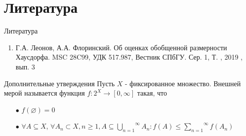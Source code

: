 \documentclass{beamer}
\begin{document}
\section{Литература}

\begin{frame}{Литература}
    \begin{enumerate}
    	\item 
    	    Г.А. Леонов, А.А.  Флоринский. Об оценках обобщенной размерности Хаусдорфа. MSC 28C99, УДК 517.987, Вестник СПбГУ. Сер. 1, Т. , 2019 , вып. 3
    \end{enumerate}
\end{frame}




\begin{frame}{Дополнительные утверждения}
    Пусть $X$ - фиксированное множество.
    Внешней мерой называется функция $f : 2^X \to [0, \infty]$ такая, что
    \begin{enumerate}
        \item[$\bullet$] $f(\varnothing) = 0$
        \item[$\bullet$] $\forall A \subseteq X$,
        $\forall A_n \subset X, n \geq 1,
        A \subseteq \overset{\infty}{ \underset{n = 1}{ \bigcup } } A_n :
        f(A) \leq \overset{\infty}{ \underset{n = 1}{ \sum } } f(A_n)$
    \end{enumerate}
\end{frame}
\end{document}
